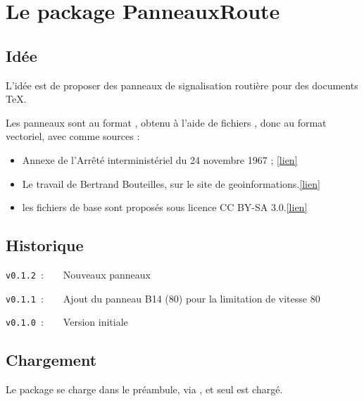 \documentclass[french,11pt,a4paper]{article}
\begin{document}
\section{Le package PanneauxRoute}

\subsection{Idée}

L'idée est de proposer des panneaux de signalisation routière pour des documents \TeX.

\smallskip

Les panneaux sont au format , obtenu à l'aide de fichiers , donc au format vectoriel, avec comme sources :

\medskip

\begin{itemize}
	\item \og Annexe de l’Arrêté interministériel du 24 novembre 1967 \fg{} ;  \hfill\href{https://equipementsdelaroute.cerema.fr/version-consolidee-de-l-arrete-du-24-novembre-1967-a537.html}{[lien]}
	\item Le travail de Bertrand Bouteilles, sur le site de geoinformations.\hfill\href{https://www.geoinformations.developpement-durable.gouv.fr/panneaux-routiers-au-format-svg-et-png-par-a2688.html}{[lien]}
	\item les fichiers  de base sont proposés sous licence CC BY-SA 3.0.\hfill\href{http://sig974.free.fr/?p=1520}{[lien]}
\end{itemize}

\subsection{Historique}

\verb|v0.1.2|~:~~~~Nouveaux panneaux

\verb|v0.1.1|~:~~~~Ajout du panneau B14 (80) pour la limitation de vitesse 80

\verb|v0.1.0|~:~~~~Version initiale

\subsection{Chargement}

Le package se charge dans le préambule, via , et seul  est chargé.

\begin{codehigh}[language=latex/latex3,style/main=cyan!5,style/code=cyan!5]
\usepackage{PanneauxRoute}
\end{codehigh}
\end{document}

